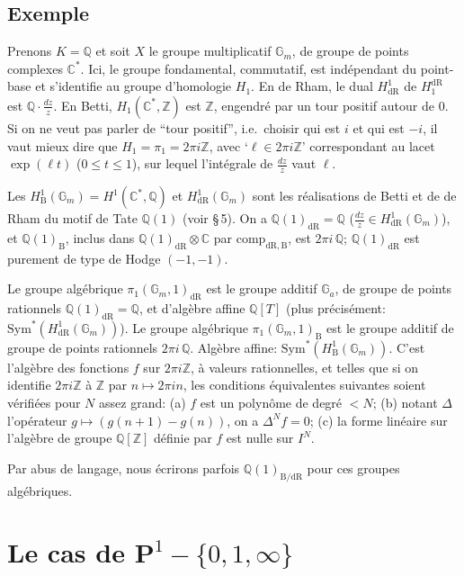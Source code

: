 \documentclass[11pt,a4paper]{article}
\theoremstyle{plain}
\theoremstyle{definition}
\newcommand{\Z}{\mathbb{Z}}
\newcommand{\Q}{\mathbb{Q}}
\newcommand{\C}{\mathbb{C}}
\newcommand{\Gm}{\mathbb{G}_m}
\newcommand{\Ga}{\mathbb{G}_a}
\newcommand{\dR}{\mathrm{dR}}
\newcommand{\B}{\mathrm{B}}
\newcommand{\comp}{\mathrm{comp}}
\begin{document}
\subsection{Exemple}\label{ssec:2.4}

Prenons $K = \Q$ et soit $X$ le groupe multiplicatif $\Gm$, de groupe de points complexes $\C^*$. Ici, le groupe fondamental, commutatif, est ind\'ependant du point-base et s'identifie au groupe d'homologie $H_1$. En de Rham, le dual $H_{\dR}^1$ de $H_1^{\dR}$ est $\Q \cdot \frac{dz}{z}$. En Betti, $H_1(\C^*,\Z)$ est $\Z$, engendr\'e par un tour positif autour de $0$. Si on ne veut pas parler de ``tour positif'', i.e.~choisir qui est $i$ et qui est $-i$, il vaut mieux dire que $H_1 = \pi_1 = 2\pi i\Z$, avec `$\ell \in 2\pi i\Z$' correspondant au lacet $\exp(\ell t)$ ($0 \leq t \leq 1$), sur lequel l'int\'egrale de $\frac{dz}{z}$ vaut $\ell$.

Les $H_{\B}^1(\Gm) = H^1(\C^*,\Q)$ et $H_{\dR}^1(\Gm)$ sont les r\'ealisations de Betti et de de Rham du motif de Tate $\Q(1)$ (voir \S\,5). On a $\Q(1)_{\dR} = \Q$ ($\frac{dz}{z} \in H_{\dR}^1(\Gm)$), et $\Q(1)_{\B}$, inclus dans $\Q(1)_{\dR} \otimes \C$ par $\comp_{\dR,\B}$, est $2\pi i\,\Q$; $\Q(1)_{\dR}$ est purement de type de Hodge $(-1,-1)$.

Le groupe alg\'ebrique $\pi_1(\Gm,1)_{\dR}$ est le groupe additif $\Ga$, de groupe de points rationnels $\Q(1)_{\dR} = \Q$, et d'alg\`ebre affine $\Q[T]$ (plus pr\'ecis\'ement: $\mathrm{Sym}^*(H_{\dR}^1(\Gm))$). Le groupe alg\'ebrique $\pi_1(\Gm,1)_{\B}$ est le groupe additif de groupe de points rationnels $2\pi i\,\Q$. Alg\`ebre affine: $\mathrm{Sym}^*(H_{\B}^1(\Gm))$. C'est l'alg\`ebre des fonctions $f$ sur $2\pi i\Z$, \`a valeurs rationnelles, et telles que si on identifie $2\pi i\Z$ \`a $\Z$ par $n \mapsto 2\pi i n$, les conditions \'equivalentes suivantes soient v\'erifi\'ees pour $N$ assez grand: (a) $f$ est un polyn\^ome de degr\'e $< N$; (b) notant $\Delta$ l'op\'erateur $g \mapsto (g(n+1)-g(n))$, on a $\Delta^N f = 0$; (c) la forme lin\'eaire sur l'alg\`ebre de groupe $\Q[\Z]$ d\'efinie par $f$ est nulle sur $I^N$.

Par abus de langage, nous \'ecrirons parfois $\Q(1)_{\B/\dR}$ pour ces groupes alg\'ebriques.

\section{Le cas de $\mathbf{P}^1 - \{0,1,\infty\}$}\label{sec:3}

\subsection{}\label{ssec:3.1}
\end{document}
